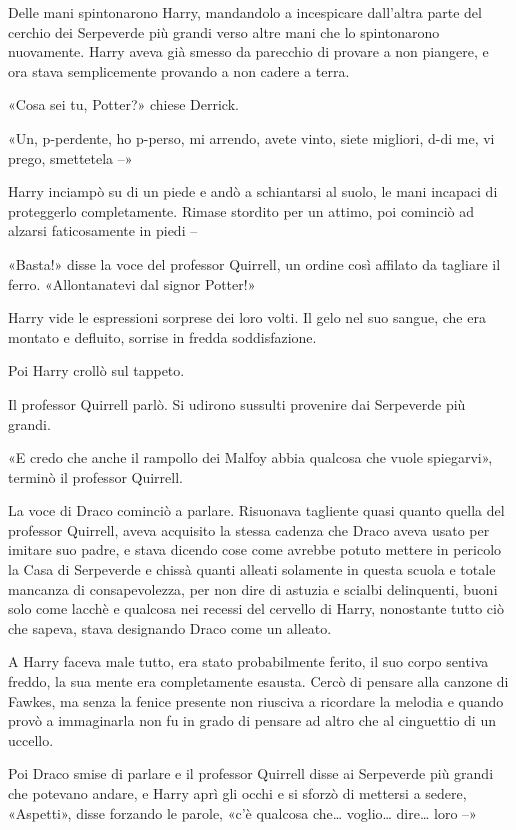 Delle mani spintonarono Harry, mandandolo a incespicare dall’altra parte del cerchio dei Serpeverde più grandi verso altre mani che lo spintonarono nuovamente. Harry aveva già smesso da parecchio di provare a non piangere, e ora stava semplicemente provando a non cadere a terra.

«Cosa sei tu, Potter?» chiese Derrick.

«Un, p-perdente, ho p-perso, mi arrendo, avete vinto, siete migliori, d-di me, vi prego, smettetela –»

Harry inciampò su di un piede e andò a schiantarsi al suolo, le mani incapaci di proteggerlo completamente. Rimase stordito per un attimo, poi cominciò ad alzarsi faticosamente in piedi –

«Basta!» disse la voce del professor Quirrell, un ordine così affilato da tagliare il ferro. «Allontanatevi dal signor Potter!»

Harry vide le espressioni sorprese dei loro volti. Il gelo nel suo sangue, che era montato e defluito, sorrise in fredda soddisfazione.

Poi Harry crollò sul tappeto.

Il professor Quirrell parlò. Si udirono sussulti provenire dai Serpeverde più grandi.

«E credo che anche il rampollo dei Malfoy abbia qualcosa che vuole spiegarvi», terminò il professor Quirrell.

La voce di Draco cominciò a parlare. Risuonava tagliente quasi quanto quella del professor Quirrell, aveva acquisito la stessa cadenza che Draco aveva usato per imitare suo padre, e stava dicendo cose come avrebbe potuto mettere in pericolo la Casa di Serpeverde e chissà quanti alleati solamente in questa scuola e totale mancanza di consapevolezza, per non dire di astuzia e scialbi delinquenti, buoni solo come lacchè e qualcosa nei recessi del cervello di Harry, nonostante tutto ciò che sapeva, stava designando Draco come un alleato.

A Harry faceva male tutto, era stato probabilmente ferito, il suo corpo sentiva freddo, la sua mente era completamente esausta. Cercò di pensare alla canzone di Fawkes, ma senza la fenice presente non riusciva a ricordare la melodia e quando provò a immaginarla non fu in grado di pensare ad altro che al cinguettio di un uccello.

Poi Draco smise di parlare e il professor Quirrell disse ai Serpeverde più grandi che potevano andare, e Harry aprì gli occhi e si sforzò di mettersi a sedere, «Aspetti», disse forzando le parole, «c’è qualcosa che… voglio… dire… loro –»

